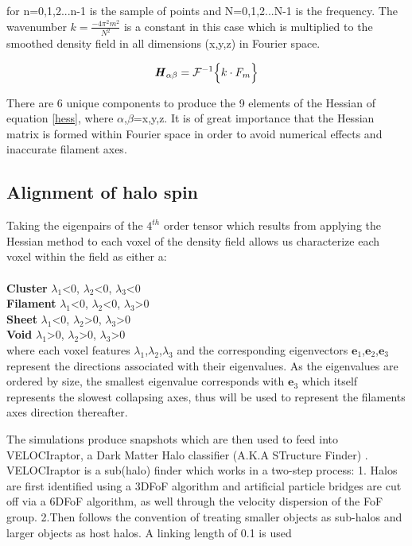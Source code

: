 \documentclass[a4paper,fleqn,usenatbib]{mnras}
\begin{document}
for n=0,1,2...n-1 is the sample of points and N=0,1,2...N-1 is the frequency. The wavenumber $k=\frac{-4\pi^{2}m^{2}}{N^{2}}$ is a constant in this case which is multiplied to the smoothed density field in all dimensions (x,y,z) in Fourier space.
\begin{ceqn}
\begin{equation}
\textbf{\textit{H}}_{\alpha \beta}=\mathcal{F}^{-1}\Big\{k\cdot F_{m}\Big\}
\end{equation}
\end{ceqn}
There are 6 unique components to produce the 9 elements of the Hessian of equation \ref{hess}, where $\alpha$,$\beta$=x,y,z. It is of great importance that the Hessian matrix is formed within Fourier space in order to avoid numerical effects and inaccurate filament axes.

\subsection{Alignment of halo spin}

Taking the eigenpairs of the $4^{th}$ order tensor which results from applying the Hessian method to each voxel of the density field allows us characterize each voxel within the field as either a:
\\
\\
\textbf{Cluster} $\lambda_{1}$<0, $\lambda_{2}$<0, $\lambda_{3}$<0
\\
\textbf{Filament} $\lambda_{1}$<0, $\lambda_{2}$<0, $\lambda_{3}$>0
\\
\textbf{Sheet} $\lambda_{1}$<0, $\lambda_{2}$>0, $\lambda_{3}$>0
\\
\textbf{Void} $\lambda_{1}$>0, $\lambda_{2}$>0, $\lambda_{3}$>0
\\

where each voxel features $\lambda_{1}$,$\lambda_{2}$,$\lambda_{3}$ and the corresponding eigenvectors $\textbf{e}_{1}$,$\textbf{e}_{2}$,$\textbf{e}_{3}$ represent the directions associated with their eigenvalues. As the eigenvalues are ordered by size, the smallest eigenvalue corresponds with $\textbf{e}_{3}$  which itself represents the slowest collapsing axes, thus will be used to represent the filaments axes direction thereafter.

The simulations produce snapshots which are then used to feed into VELOCIraptor, a Dark Matter Halo classifier (A.K.A STructure Finder) \citep{Elahi_11}. VELOCIraptor is a sub(halo) finder which works in a two-step process:
1. Halos are first identified using a  3DFoF algorithm and artificial  particle bridges are cut off via a 6DFoF algorithm, as well through the velocity dispersion of the FoF group.
2.Then follows the convention of treating smaller objects as sub-halos and larger objects as host halos. 
A linking length of 0.1 is used
\end{document}
